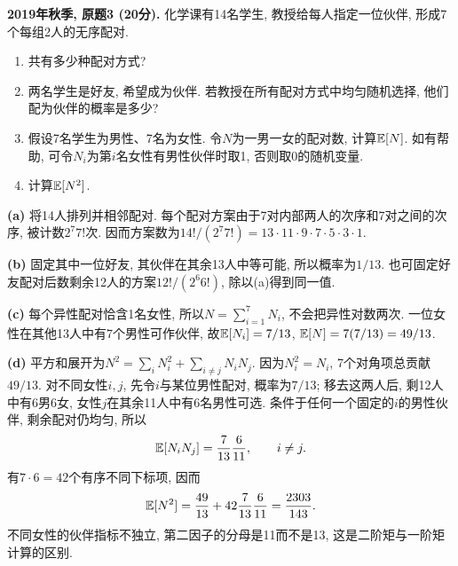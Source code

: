 \begin{exercise}\label{ex:m1-2019f-q3}
\textbf{2019年秋季, 原题3 (20分).} 化学课有14名学生, 教授给每人指定一位伙伴, 形成7个每组2人的无序配对.
\begin{enumerate}
\item[(a)]\label{ex:m1-2019f-q3-a} 共有多少种配对方式?
\item[(b)]\label{ex:m1-2019f-q3-b} 两名学生是好友, 希望成为伙伴. 若教授在所有配对方式中均匀随机选择, 他们配为伙伴的概率是多少?
\item[(c)]\label{ex:m1-2019f-q3-c} 假设7名学生为男性、7名为女性. 令$N$为一男一女的配对数, 计算$\mathbb E[N]$. 如有帮助, 可令$N_i$为第$i$名女性有男性伙伴时取1, 否则取0的随机变量.
\item[(d)]\label{ex:m1-2019f-q3-d} 计算$\mathbb E[N^2]$.
\end{enumerate}
\end{exercise}
\begin{solution}
\textbf{(a)}\label{sol:m1-2019f-q3-a} 将14人排列并相邻配对. 每个配对方案由于7对内部两人的次序和7对之间的次序, 被计数$2^7 7!$次. 因而方案数为$14!/(2^7 7!)=13\cdot11\cdot9\cdot7\cdot5\cdot3\cdot1$.

\textbf{(b)}\label{sol:m1-2019f-q3-b} 固定其中一位好友, 其伙伴在其余13人中等可能, 所以概率为$1/13$. 也可固定好友配对后数剩余12人的方案$12!/(2^6 6!)$, 除以(a)得到同一值.

\textbf{(c)}\label{sol:m1-2019f-q3-c} 每个异性配对恰含1名女性, 所以$N=\sum_{i=1}^7N_i$, 不会把异性对数两次. 一位女性在其他13人中有7个男性可作伙伴, 故$\mathbb E[N_i]=7/13$, $\mathbb E[N]=7(7/13)=49/13$.

\textbf{(d)}\label{sol:m1-2019f-q3-d} 平方和展开为$N^2=\sum_iN_i^2+\sum_{i\ne j}N_iN_j$. 因为$N_i^2=N_i$, 7个对角项总贡献$49/13$. 对不同女性$i,j$, 先令$i$与某位男性配对, 概率为$7/13$; 移去这两人后, 剩12人中有6男6女, 女性$j$在其余11人中有6名男性可选. 条件于任何一个固定的$i$的男性伙伴, 剩余配对仍均匀, 所以
\[
\mathbb E[N_iN_j]=\frac7{13}\frac6{11},\qquad i\ne j.
\]
有$7\cdot6=42$个有序不同下标项, 因而
\[
\mathbb E[N^2]=\frac{49}{13}+42\frac7{13}\frac6{11}
=\frac{2303}{143}.
\]
不同女性的伙伴指标不独立, 第二因子的分母是11而不是13, 这是二阶矩与一阶矩计算的区别.
\end{solution}

